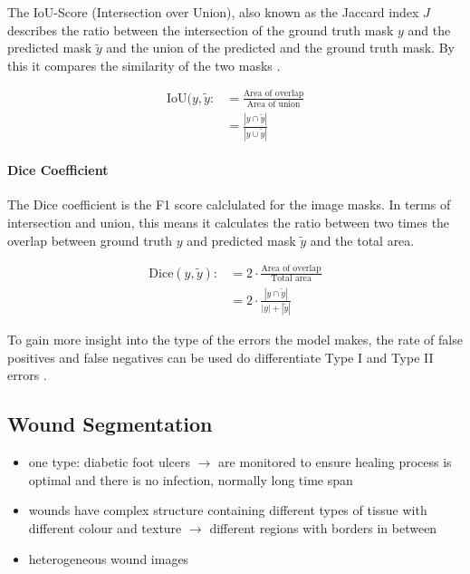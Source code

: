 The IoU-Score (Intersection over Union), also known as the Jaccard index $J$ describes the ratio between the intersection of the ground truth mask $y$ and the predicted mask $\tilde{y}$ and the union of the predicted and the ground truth mask. By this it compares the similarity of the two masks \cite{Cho2021WeightedIO}.

\begin{align}
	\text{IoU}(y, \tilde{y} :&= \frac{\text{Area of overlap}}{\text{Area of union}}\\
	&=\frac{|y \cap \tilde{y}|}{|y \cup \tilde {y}|}
\end{align}


\paragraph{Dice Coefficient}

The Dice coefficient is the F1 score calclulated for the image masks. In terms of intersection and union, this means it calculates the ratio between two times the overlap between ground truth $y$ and predicted mask $\tilde{y}$ and the total area.

\begin{align}
	\text{Dice}(y, \tilde{y}) :&= 2 \cdot \frac{\text{Area of overlap}}{\text{Total area}}\\
	&= 2 \cdot \frac{|y \cap \tilde{y}|}{|y| + |\tilde{y}|}
\end{align}

To gain more insight into the type of the errors the model makes, the rate of false positives and false negatives can be used do differentiate Type I and Type II errors \cite{DFUC2022}.


\subsection{Wound Segmentation}

\begin{itemize}
	\item one type: diabetic foot ulcers $\rightarrow$ are monitored to ensure healing process is optimal and there is no infection, normally long time span \cite{DFUC2022}
\end{itemize}

\begin{itemize}
	\item wounds have complex structure containing different types of tissue with different colour and texture $\rightarrow$ different regions with borders in between \cite{AhmadFauzi2015}
	\item heterogeneous wound images
\end{itemize}

